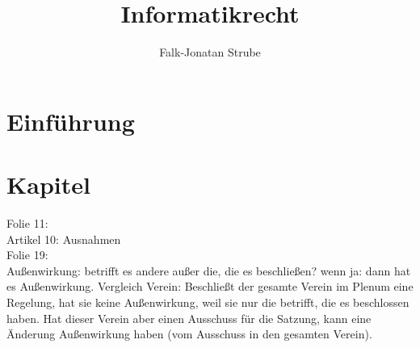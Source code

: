 \documentclass{scrreprt}
\title{Informatikrecht}
\author{Falk-Jonatan Strube}
\begin{document}
\maketitle
\tableofcontents

\chapter*{Einführung}

\chapter{Kapitel}

Folie 11:\\
Artikel 10: Ausnahmen\\
Folie 19:\\
Außenwirkung: betrifft es andere außer die, die es beschließen? wenn ja: dann hat es Außenwirkung. Vergleich Verein: Beschließt der gesamte Verein im Plenum eine Regelung, hat sie keine Außenwirkung, weil sie nur die betrifft, die es beschlossen haben. Hat dieser Verein aber einen Ausschuss für die Satzung, kann eine Änderung Außenwirkung haben (vom Ausschuss in den gesamten Verein).
\end{document}
